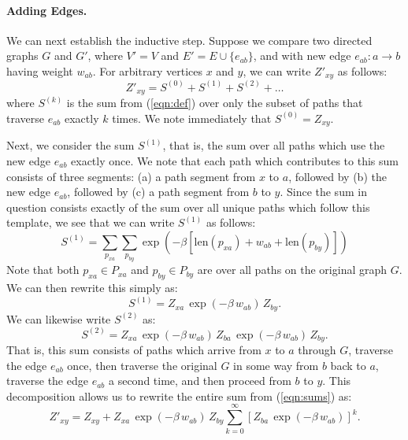 \paragraph{Adding Edges.}
We can next establish the inductive step.
Suppose we compare two directed graphs $G$ and $G'$,
where $V' = V$ and $E' = E \cup \{ e_{ab} \}$,
and with new edge $e_{ab} : a \rightarrow b$ having weight $w_{ab}$.
For arbitrary vertices $x$ and $y$, we can write $Z'_{xy}$ as follows:
\begin{equation}
   Z'_{xy} = S^{(0)} + S^{(1)} + S^{(2)} + \dots
   \label{eqn:sums}
\end{equation}
where $S^{(k)}$ is the sum from (\ref{eqn:def})
over only the subset of paths that traverse $e_{ab}$ exactly $k$ times.
We note immediately that $S^{(0)} = Z_{xy}$.

Next, we consider the sum $S^{(1)}$,
that is, the sum over all paths which use the new edge $e_{ab}$
exactly once.
We note that each path which contributes to this sum consists of
three segments:
(a) a path segment from $x$ to $a$,
followed by (b) the new edge $e_{ab}$,
followed by (c) a path segment from $b$ to $y$.
Since the sum in question consists exactly of the sum over all unique
paths which follow this template,
we see that we can write $S^{(1)}$ as follows:
\begin{equation}
   S^{(1)} = \sum_{p_{xa}} \sum_{p_{by}}
      \exp\left(
         - \beta \left[ \mbox{len}(p_{xa}) + w_{ab} + \mbox{len}(p_{by}) \right]
         \right)
\end{equation}
Note that both $p_{xa} \in P_{xa}$ and $p_{by} \in P_{by}$
are over all paths on the original graph $G$.
We can then rewrite this simply as:
\begin{equation}
   S^{(1)} = Z_{xa} \, \exp(-\beta \, w_{ab}) \, Z_{by}.
\end{equation}
We can likewise write $S^{(2)}$ as:
\begin{equation}
   S^{(2)} = Z_{xa} \, \exp(-\beta \, w_{ab}) \, Z_{ba} \, \exp(-\beta \,  w_{ab}) \, Z_{by}.
\end{equation}
That is,
this sum consists of paths which arrive from $x$ to $a$ through $G$,
traverse the edge $e_{ab}$ once,
then traverse the original $G$ in some way from $b$ back to $a$,
traverse the edge $e_{ab}$ a second time,
and then proceed from $b$ to $y$.
This decomposition allows us to rewrite
the entire sum from (\ref{eqn:sums}) as:
\begin{equation}
   Z'_{xy} = Z_{xy} + Z_{xa} \, \exp(-\beta \, w_{ab}) \, Z_{by}
      \sum_{k=0}^{\infty} \left[ Z_{ba} \, \exp(-\beta \, w_{ab}) \right]^k. 
\end{equation}

